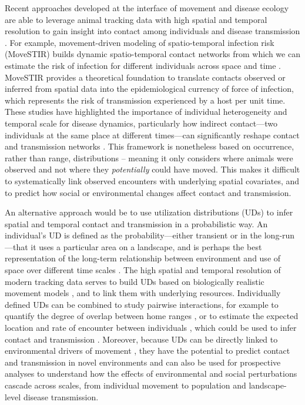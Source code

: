 \documentclass[letterpaper]{article}
\begin{document}
Recent approaches developed at the interface of movement and disease ecology are able to leverage animal tracking data with high spatial and temporal resolution to gain insight into contact among individuals and disease transmission \citep{Wilber2022,Yang2023}. For example, movement-driven modeling of spatio-temporal infection risk (MoveSTIR) builds dynamic spatio-temporal contact networks from which we can estimate the risk of infection for different individuals across space and time \citep{Wilber2022}. MoveSTIR provides a theoretical foundation to translate contacts observed or inferred from spatial data into the epidemiological currency of force of infection, which represents the risk of transmission experienced by a host per unit time. These studies have highlighted the importance of individual heterogeneity and temporal scale for disease dynamics, particularly how indirect contact---two individuals at the same place at different times---can significantly reshape contact and transmission networks \citep{Wilber2022,Yang2023}. This framework is nonetheless based on occurrence, rather than range, distributions \citep[in the terminology of ][]{Alston2022} -- meaning it only considers where animals were observed and not where they \emph{potentially} could have moved. This makes it difficult to systematically link observed encounters with underlying spatial covariates, and to predict how social or environmental changes affect contact and transmission. 

An alternative approach would be to use utilization distributions (UDs) to infer spatial and temporal contact and transmission in a probabilistic way. An individual's UD is defined as the probability---either transient or in the long-run \citep{Tao2016}---that it uses a particular area on a landscape, and is perhaps the best representation of the long-term relationship between environment and use of space over different time scales \citet{Webber2023}. The high spatial and temporal resolution of modern tracking data serves to build UDs based on biologically realistic movement models \citep{Fleming2014,Gurarie2011,Potts2023}, and to link them with underlying resources.
Individually defined UDs can be combined to study pairwise interactions, for example to quantify the degree of overlap between home ranges \citep{Winner2018}, or to estimate the expected location and rate of encounter between individuals  \citep{Noonan2021}, which could be used to infer contact and transmission \citep{Godfrey2010, Godfrey2013}. 
Moreover, because UDs can be directly linked to environmental drivers of movement \citep{Signer2017}, they have the potential to predict contact and transmission in novel environments and can also be used for prospective analyses to understand how the effects of environmental and social perturbations cascade across scales, from individual movement to population and landscape-level disease transmission. 
\end{document}
